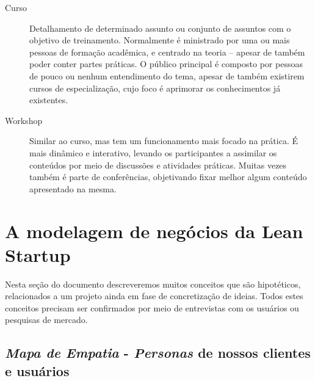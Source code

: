 \documentclass[12pt,a4paper,twoside,hyphens,english,brazil]{abntex2}
\newcommand{\hip}{{\color{BlueViolet}\framebox[1.1\width]{HIP}}}
\newcommand{\conf}{{\color{OliveGreen}\framebox[1.1\width]{CNF}}}
\begin{document}
\begin{description}
	\item[Curso] Detalhamento de determinado assunto ou conjunto de assuntos com o objetivo de treinamento. Normalmente é ministrado por uma ou mais pessoas de formação acadêmica, e centrado na teoria -- apesar de também poder conter partes práticas. O público principal é composto por pessoas de pouco ou nenhum entendimento do tema, apesar de também existirem cursos de especialização, cujo foco é aprimorar os conhecimentos já existentes.

	\item[Workshop] Similar ao curso, mas tem um funcionamento mais focado na prática. É mais dinâmico e interativo, levando os participantes a assimilar os conteúdos por meio de discussões e atividades práticas. Muitas vezes também é parte de conferências, objetivando fixar melhor algum conteúdo apresentado na mesma.
\end{description}


\section{A modelagem de negócios da Lean Startup} \label{sec:modelagem-negocios}

Nesta seção do documento descreveremos muitos conceitos que são hipotéticos, relacionados a um projeto ainda em fase de concretização de ideias. Todos estes conceitos precisam ser confirmados por meio de entrevistas com os usuários ou pesquisas de mercado.


\subsection{\emph{Mapa de Empatia} - \emph{Personas} de nossos clientes e usuários} \label{sec:mapa-empatia}
\end{document}
